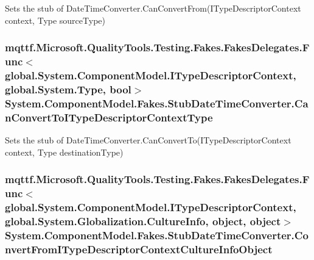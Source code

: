 Sets the stub of Date\-Time\-Converter.\-Can\-Convert\-From(\-I\-Type\-Descriptor\-Context context, Type source\-Type)

\hypertarget{class_system_1_1_component_model_1_1_fakes_1_1_stub_date_time_converter_a866fee3fae6f201b3e509e6cd0613c61}{
\subsubsection[{Can\-Convert\-To\-I\-Type\-Descriptor\-Context\-Type}]{\setlength{\rightskip}{0pt plus 5cm}mqttf.\-Microsoft.\-Quality\-Tools.\-Testing.\-Fakes.\-Fakes\-Delegates.\-Func$<$global.\-System.\-Component\-Model.\-I\-Type\-Descriptor\-Context, global.\-System.\-Type, bool$>$ System.\-Component\-Model.\-Fakes.\-Stub\-Date\-Time\-Converter.\-Can\-Convert\-To\-I\-Type\-Descriptor\-Context\-Type}}\label{class_system_1_1_component_model_1_1_fakes_1_1_stub_date_time_converter_a866fee3fae6f201b3e509e6cd0613c61}


Sets the stub of Date\-Time\-Converter.\-Can\-Convert\-To(\-I\-Type\-Descriptor\-Context context, Type destination\-Type)

\hypertarget{class_system_1_1_component_model_1_1_fakes_1_1_stub_date_time_converter_a6a5a97d07550983baf6ed98dc1d61ddf}{
\subsubsection[{Convert\-From\-I\-Type\-Descriptor\-Context\-Culture\-Info\-Object}]{\setlength{\rightskip}{0pt plus 5cm}mqttf.\-Microsoft.\-Quality\-Tools.\-Testing.\-Fakes.\-Fakes\-Delegates.\-Func$<$global.\-System.\-Component\-Model.\-I\-Type\-Descriptor\-Context, global.\-System.\-Globalization.\-Culture\-Info, object, object$>$ System.\-Component\-Model.\-Fakes.\-Stub\-Date\-Time\-Converter.\-Convert\-From\-I\-Type\-Descriptor\-Context\-Culture\-Info\-Object}}\label{class_system_1_1_component_model_1_1_fakes_1_1_stub_date_time_converter_a6a5a97d07550983baf6ed98dc1d61ddf}


